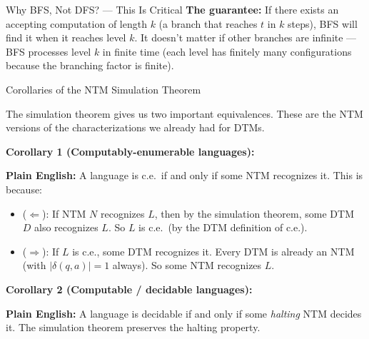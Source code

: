 \begin{conceptbox}{{Why BFS, Not DFS? --- This Is Critical}}
\textbf{The guarantee:} If there exists an accepting computation of length $k$
(a branch that reaches $t$ in $k$ steps), BFS will find it when it reaches
level $k$. It doesn't matter if other branches are infinite --- BFS processes
level $k$ in finite time (each level has finitely many configurations because
the branching factor is finite).

\end{conceptbox}

\begin{definitionbox}{{Corollaries of the NTM Simulation Theorem}}

The simulation theorem gives us two important equivalences. These are the NTM
versions of the characterizations we already had for DTMs.

\textbf{Corollary 1 (Computably-enumerable languages):}

\textbf{Plain English:} A language is c.e.\ if and only if some NTM recognizes
it. This is because:
\begin{itemize}[nosep]
\item ($\Leftarrow$): If NTM $N$ recognizes $L$, then by the simulation
  theorem, some DTM $D$ also recognizes $L$. So $L$ is c.e.\ (by the DTM
  definition of c.e.).
\item ($\Rightarrow$): If $L$ is c.e., some DTM recognizes it. Every DTM is
  already an NTM (with $|\delta(q,a)| = 1$ always). So some NTM recognizes $L$.
\end{itemize}

\textbf{Corollary 2 (Computable / decidable languages):}

\textbf{Plain English:} A language is decidable if and only if some
\emph{halting} NTM decides it. The simulation theorem preserves the halting
property.

\end{definitionbox}